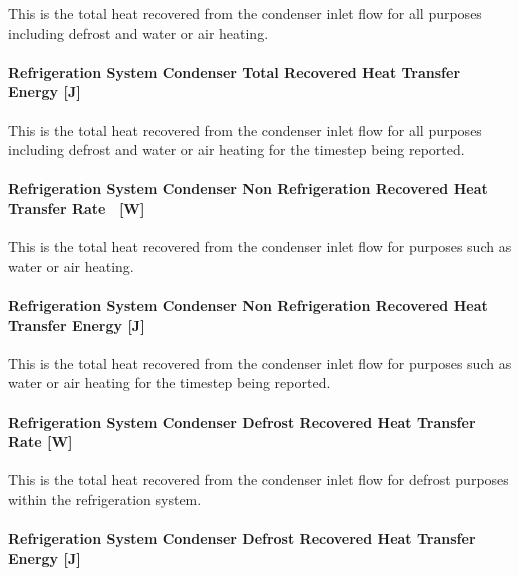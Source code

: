 This is the total heat recovered from the condenser inlet flow for all purposes including defrost and water or air heating.

\paragraph{Refrigeration System Condenser Total Recovered Heat Transfer Energy {[}J{]}}\label{refrigeration-system-condenser-total-recovered-heat-transfer-energy-j}

This is the total heat recovered from the condenser inlet flow for all purposes including defrost and water or air heating for the timestep being reported.

\paragraph{Refrigeration System Condenser Non Refrigeration Recovered Heat Transfer Rate~ {[}W{]}}\label{refrigeration-system-condenser-non-refrigeration-recovered-heat-transfer-rate-w}

This is the total heat recovered from the condenser inlet flow for purposes such as water or air heating.

\paragraph{Refrigeration System Condenser Non Refrigeration Recovered Heat Transfer Energy {[}J{]}}\label{refrigeration-system-condenser-non-refrigeration-recovered-heat-transfer-energy-j}

This is the total heat recovered from the condenser inlet flow for purposes such as water or air heating for the timestep being reported.

\paragraph{Refrigeration System Condenser Defrost Recovered Heat Transfer Rate {[}W{]}}\label{refrigeration-system-condenser-defrost-recovered-heat-transfer-rate-w}

This is the total heat recovered from the condenser inlet flow for defrost purposes within the refrigeration system.

\paragraph{Refrigeration System Condenser Defrost Recovered Heat Transfer Energy {[}J{]}}\label{refrigeration-system-condenser-defrost-recovered-heat-transfer-energy-j}

